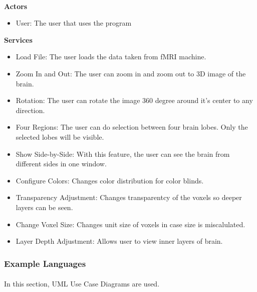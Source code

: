 \paragraph{}
\normalsize
    \textbf{Actors} \\
    \begin{itemize}
    	\item User: The user that uses the program
    \end{itemize}
    
    \textbf{Services} \\
    \begin{itemize}
    	\item Load File: The user loads the data taken from fMRI machine.
        \item Zoom In and Out: The user can zoom in and zoom out to 3D image of the brain.
        \item Rotation: The user can rotate the image 360 degree around it's center to any direction.
        \item Four Regions: The user can do selection between four brain lobes. Only the selected lobes will be visible.
        \item Show Side-by-Side: With this feature, the user can see the brain from different sides in one window.
        \item Configure Colors: Changes color distribution for color blinds.
        \item Transparency Adjustment: Changes transparentcy of the voxels so deeper layers can be seen.
        \item Change Voxel Size: Changes unit size of voxels in case size is miscalulated.
        \item Layer Depth Adjustment: Allows user to view inner layers of brain.
        
    \end{itemize}
    
\skipsubsection


\subsubsection{Example Languages}
\paragraph{}
\normalsize
    In this section, UML Use Case Diagrams are used.
\skipsubsection
